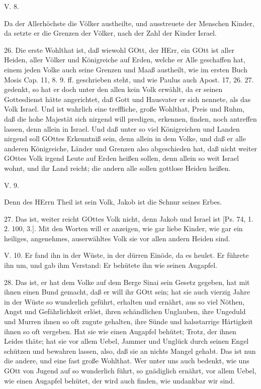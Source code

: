 \begin{schriftzitat}
V. 8.
\end{schriftzitat}

Da der Allerhöchste die Völker austheilte, und ausstreuete der Menschen Kinder, da setzte er die Grenzen der Völker, nach der Zahl der Kinder Israel.

26. Die erste Wohlthat ist, daß wiewohl GOtt, der HErr, ein GOtt ist aller Heiden, aller Völker und Königreiche auf Erden, welche er Alle geschaffen hat, einem jeden Volke auch seine Grenzen und Maaß austheilt, wie im ersten Buch Mosis Cap. 11, 8. 9. ff. geschrieben steht, und wie Paulus auch Apost. 17, 26. 27. gedenkt, so hat er doch unter den allen kein Volk erwählt, da er seinen Gottesdienst hätte angerichtet, daß Gott und Hausvater er sich nennete, als das Volk Israel. Und ist wahrlich eine treffliche, große Wohlthat, Preis und Ruhm, daß die hohe Majestät sich nirgend will predigen, erkennen, finden, noch antreffen lassen, denn allein in Israel. Und daß unter so viel Königreichen und Landen nirgend soll GOttes Erkenntniß sein, denn allein in dem Volke, und daß er alle anderen Königreiche, Länder und Grenzen also abgeschieden hat, daß nicht weiter GOttes Volk irgend Leute auf Erden heißen sollen, denn allein so weit Israel wohnt, und ihr Land reicht; die andern alle sollen gottlose Heiden heißen.

\begin{schriftzitat}
V. 9.
\end{schriftzitat}

Denn des HErrn Theil ist sein Volk, Jakob ist die Schnur seines Erbes.

27. Das ist, weiter reicht GOttes Volk nicht, denn Jakob und Israel ist [Ps. 74, 1. 2. 100, 3.]. Mit den Worten will er anzeigen, wie gar liebe Kinder, wie gar ein heiliges, angenehmes, auserwähltes Volk sie vor allen andern Heiden sind.

\begin{schriftzitat}
V. 10. Er fand ihn in der Wüste, in der dürren Einöde, da es heulet. Er führete ihn um, und gab ihm Verstand: Er behütete ihn wie seinen Augapfel.
\end{schriftzitat}

28. Das ist, er hat dem Volke auf dem Berge Sinai sein Gesetz gegeben, hat mit ihnen einen Bund gemacht, daß er will ihr GOtt sein; hat sie auch vierzig Jahre in der Wüste so wunderlich geführt, erhalten und ernährt, aus so viel Nöthen, Angst und Gefährlichkeit erlöst, ihren schändlichen Unglauben, ihre Ungeduld und Murren ihnen so oft zugute gehalten, ihre Sünde und halsstarrige Härtigkeit ihnen so oft vergeben. Hat sie wie einen Augapfel behütet; Trotz, der ihnen Leides thäte; hat sie vor allem Uebel, Jammer und Unglück durch seinen Engel schützen und bewahren lassen, also, daß sie an nichts Mangel gehabt. Das ist nun die andere, und eine fast große Wohlthat. Wer unter uns auch bedenkt, wie uns GOtt von Jugend auf so wunderlich führt, so gnädiglich ernährt, vor allem Uebel, wie einen Augapfel behütet, der wird auch finden, wie undankbar wir sind.

